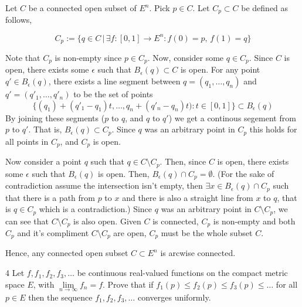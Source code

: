 \documentclass[12pt]{article}
\begin{document}
\begin{solution}
    \bbni 

    Let $C$ be a connected open subset of $E^n$. Pick $p \in C$. Let $C_p \subset C$ be defined as follows, 

    \[C_p:= \{q \in C \, \big | \, \exists f: [0,1] \to E^n: f(0) = p, \,f(1) = q\}\]

    Note that $C_p$ is non-empty since $p \in C_p$. Now, consider some $q \in C_p$. Since $C$ is open, there exists some $\epsilon$ such that $B_\epsilon(q) \subset C$ is open. For any point $q' \in B_\epsilon(q)$, there exists a line segment between $q = (q_1, \ldots, q_n)$ and $q' = (q'_1, \ldots, q'_n)$ to be the set of points 
    \[\{(q_1) + (q'_1-q_1)t, \ldots , q_n + (q'_n-q_n)t): t \in [0,1]\} \subset B_\epsilon(q)\]
    By joining these segments ($p$ to $q$, and $q$ to $q'$) we get a continous segement from $p$ to $q'$. That is, $B_\epsilon(q) \subset C_p$. Since $q$ was an arbitrary point in $C_p$ this holds for all points in $C_p$, and $C_p$ is open. 

    Now consider a point $q$ such that $q \in C \setminus C_p$. Then, since $C$ is open, there exists some $\epsilon$ such that $B_\epsilon(q)$ is open. Then, $B_\epsilon(q) \cap C_p = \emptyset$. (For the sake of contradiction assume the intersection isn't empty, then $\exists x \in B_\epsilon(q) \cap C_p$ such that there is a path from $p$ to $x$ and there is also a straight line from $x$ to $q$, that is $q \in C_p$ which is a contradiction.) Since $q$ was an arbitrary point in $C \setminus C_p$, we can see that $C\setminus C_p$ is also open. Given $C$ is connected, $C_p$ is non-empty and both $C_p$ and it's compliment $C \setminus C_p$ are open, $C_p$ must be the whole subset $C$. 

    Hence, any connected open subset $C \subset E^n$ is arcwise connected. 

\end{solution}

\newpage

\begin{problem}{4}
    Let $f, f_1, f_2, f_3, \ldots$ be continuous real-valued functions on the compact metric space $E$, with $\underset{n\to\infty}{\lim} f_n = f$. Prove that if $f_1(p) \leq f_2(p) \leq f_3(p) \leq \ldots$ for all $p\in E$ then the sequence $f_1, f_2, f_3, \ldots$ converges uniformly.
\end{problem}
\end{document}
